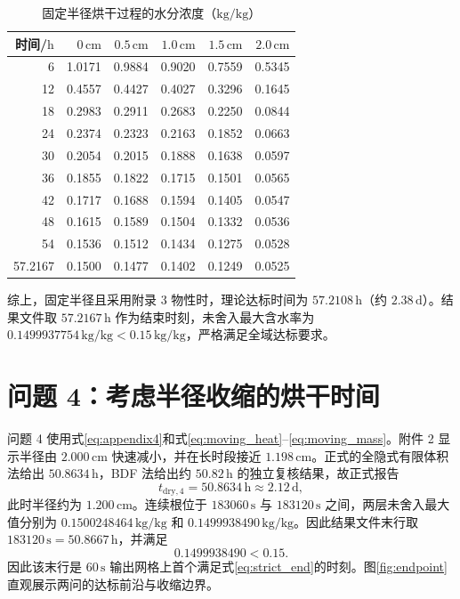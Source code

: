 \documentclass[UTF8,a4paper,zihao=-4,fontset=fandol]{ctexart}
\newcommand{\unit}[1]{\,\mathrm{#1}}
\begin{document}
\begin{table}[H]
\centering
\caption{固定半径烘干过程的水分浓度（$\mathrm{kg/kg}$）}
\label{tab:q3}
\small
\begin{tabular}{rrrrrr}
\toprule
时间/$\mathrm{h}$ & $0\unit{cm}$ & $0.5\unit{cm}$ & $1.0\unit{cm}$ & $1.5\unit{cm}$ & $2.0\unit{cm}$ \\
\midrule
6  & 1.0171 & 0.9884 & 0.9020 & 0.7559 & 0.5345 \\
12 & 0.4557 & 0.4427 & 0.4027 & 0.3296 & 0.1645 \\
18 & 0.2983 & 0.2911 & 0.2683 & 0.2250 & 0.0844 \\
24 & 0.2374 & 0.2323 & 0.2163 & 0.1852 & 0.0663 \\
30 & 0.2054 & 0.2015 & 0.1888 & 0.1638 & 0.0597 \\
36 & 0.1855 & 0.1822 & 0.1715 & 0.1501 & 0.0565 \\
42 & 0.1717 & 0.1688 & 0.1594 & 0.1405 & 0.0547 \\
48 & 0.1615 & 0.1589 & 0.1504 & 0.1332 & 0.0536 \\
54 & 0.1536 & 0.1512 & 0.1434 & 0.1275 & 0.0528 \\
57.2167 & 0.1500 & 0.1477 & 0.1402 & 0.1249 & 0.0525 \\
\bottomrule
\end{tabular}
\end{table}

综上，固定半径且采用附录 3 物性时，理论达标时间为 $57.2108\unit{h}$（约 $2.38\unit{d}$）。结果文件取 $57.2167\unit{h}$ 作为结束时刻，未舍入最大含水率为 $0.1499937754\unit{kg/kg}<0.15\unit{kg/kg}$，严格满足全域达标要求。

\section{问题 4：考虑半径收缩的烘干时间}

问题 4 使用式\eqref{eq:appendix4}和式\eqref{eq:moving_heat}--\eqref{eq:moving_mass}。附件 2 显示半径由 $2.000\unit{cm}$ 快速减小，并在长时段接近 $1.198\unit{cm}$。正式的全隐式有限体积法给出 $50.8634\unit{h}$，BDF 法给出约 $50.82\unit{h}$ 的独立复核结果，故正式报告
\begin{equation}
t_{\mathrm{dry},4}=50.8634\unit{h}\approx2.12\unit{d},
\end{equation}
此时半径约为 $1.200\unit{cm}$。连续根位于 $183060\unit{s}$ 与 $183120\unit{s}$ 之间，两层未舍入最大值分别为 $0.1500248464\unit{kg/kg}$ 和 $0.1499938490\unit{kg/kg}$。因此结果文件末行取 $183120\unit{s}=50.8667\unit{h}$，并满足
\begin{equation}
0.1499938490<0.15.
\end{equation}
因此该末行是 $60\unit{s}$ 输出网格上首个满足式\eqref{eq:strict_end}的时刻。图\ref{fig:endpoint}直观展示两问的达标前沿与收缩边界。
\end{document}
